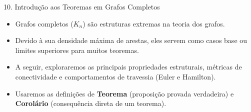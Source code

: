 \documentclass[9pt]{beamer}
\begin{document}
    \begin{frame}{10. Introdução aos Teoremas em Grafos Completos}
        \begin{itemize}
            \item Grafos completos ($K_n$) são estruturas extremas na teoria dos grafos.
            \item Devido à sua densidade máxima de arestas, eles servem como casos base ou limites superiores para muitos teoremas.
            \item A seguir, exploraremos as principais propriedades estruturais, métricas de conectividade e comportamentos de travessia (Euler e Hamilton).
            \item Usaremos as definições de \textbf{Teorema} (proposição provada verdadeira) e \textbf{Corolário} (consequência direta de um teorema).
        \end{itemize}
    \end{frame}
\end{document}
